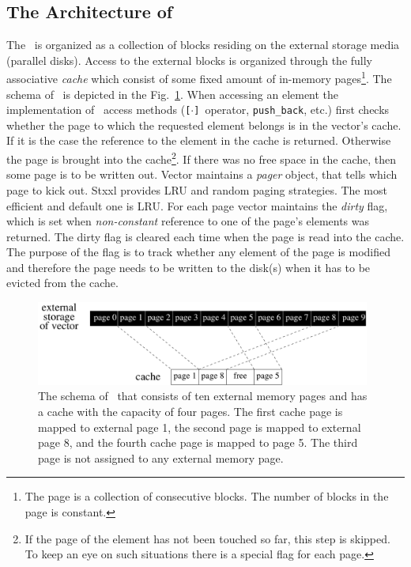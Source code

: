 \documentclass[twoside]{book}
\newcommand{\stxxl}{{\sc Stxxl} }
\begin{document}
\subsection{The Architecture of \xvector}
The \xvector\ is organized as a collection of blocks residing on the
external storage media (parallel disks). Access to the external blocks
is organized through the fully associative \emph{cache} which consist of some
fixed amount of in-memory pages\footnote{The page is a collection of
consecutive blocks. The number of blocks in the page is
constant.}. The schema of 
\xvector\ is depicted 
in the Fig.~\ref{xvectorschema}. When accessing an element the
implementation of \xvector\ access methods (\texttt{[$\cdot$]}~operator,
\texttt{push\_back}, etc.) first checks
whether the page to which the requested element belongs is in the
vector's cache. If it is the case the reference to the
element in the cache is returned. Otherwise the page is brought into the
cache\footnote{If the page of the element has not been touched so 
far, this step is skipped. To keep an eye on such situations there is a
special flag 
for each page.}. If there was no free space in the cache, then some
page is to be written out. Vector maintains a \emph{pager} object, that
tells which page to kick out. \stxxl provides LRU and random paging
strategies. The most efficient and default one is LRU. For each page
vector maintains the \emph{dirty} flag, which is set when
\emph{non-constant} reference to one of the page's elements was
returned. The dirty flag 
is cleared each time when the page is read into the cache. The purpose of the
flag is to track whether any element of the page is modified and
therefore the page needs to
be written to the disk(s) when it has to be evicted from the
cache. 

\begin{figure}[hb]
\begin{center}
\includegraphics[width=11cm]{vector}
\end{center}
\vspace*{-0.3cm}
\caption{\label{xvectorschema} The schema of \xvector\ that consists
of ten external memory pages and has a cache with the capacity of four
pages. The 
first cache page is mapped to external page 1, the second page
is mapped to external page 8, and the fourth cache page is
mapped to page 5. The third page is not assigned to any external
memory page. }
\end{figure}
\end{document}
